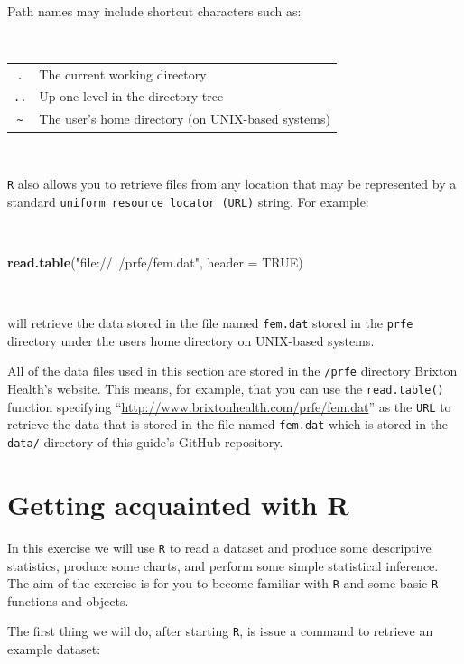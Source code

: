 \documentclass[12pt,a4paper]{book}
\newenvironment{Shaded}{\begin{snugshade}}{\end{snugshade}}
\newcommand{\KeywordTok}[1]{\textcolor[rgb]{0.13,0.29,0.53}{\textbf{#1}}}
\newcommand{\DataTypeTok}[1]{\textcolor[rgb]{0.13,0.29,0.53}{#1}}
\newcommand{\StringTok}[1]{\textcolor[rgb]{0.31,0.60,0.02}{#1}}
\newcommand{\OtherTok}[1]{\textcolor[rgb]{0.56,0.35,0.01}{#1}}
\newcommand{\NormalTok}[1]{#1}
\theoremstyle{definition}
\theoremstyle{definition}
\theoremstyle{definition}
\theoremstyle{remark}
\begin{document}
~

Path names may include shortcut characters such as:

~

\begin{longtable}[]{@{}cl@{}}
\toprule
\texttt{.} & The current working directory\tabularnewline
\texttt{..} & Up one level in the directory tree\tabularnewline
\texttt{\textasciitilde{}} & The user's home directory (on UNIX-based
systems)\tabularnewline
\bottomrule
\end{longtable}

~

\texttt{R} also allows you to retrieve files from any location that may
be represented by a standard \texttt{uniform\ resource\ locator\ (URL)}
string. For example:

~

\begin{Shaded}
\begin{Highlighting}[]
\KeywordTok{read.table}\NormalTok{(}\StringTok{"file://~/prfe/fem.dat"}\NormalTok{, }\DataTypeTok{header =} \OtherTok{TRUE}\NormalTok{)}
\end{Highlighting}
\end{Shaded}

~

will retrieve the data stored in the file named \texttt{fem.dat} stored
in the \texttt{prfe} directory under the users home directory on
UNIX-based systems.

All of the data files used in this section are stored in the
\texttt{/prfe} directory Brixton Health's website. This means, for
example, that you can use the \texttt{read.table()} function specifying
``\url{http://www.brixtonhealth.com/prfe/fem.dat}'' as the \texttt{URL}
to retrieve the data that is stored in the file named \texttt{fem.dat}
which is stored in the \texttt{data/} directory of this guide's GitHub
repository.

\hypertarget{exercise1}{%
\chapter{Getting acquainted with R}\label{exercise1}}

In this exercise we will use \texttt{R} to read a dataset and produce
some descriptive statistics, produce some charts, and perform some
simple statistical inference. The aim of the exercise is for you to
become familiar with \texttt{R} and some basic \texttt{R} functions and
objects.

The first thing we will do, after starting \texttt{R}, is issue a
command to retrieve an example dataset:
\end{document}
